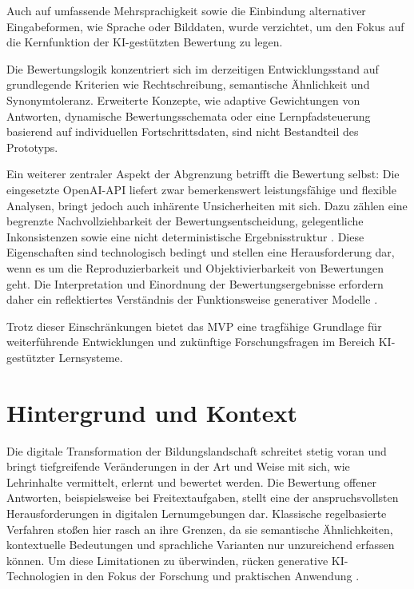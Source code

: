\documentclass[a4paper,12pt]{article}
\begin{document}
Auch auf umfassende Mehrsprachigkeit sowie die Einbindung alternativer Eingabeformen, wie Sprache oder Bilddaten, wurde verzichtet, um den Fokus auf die Kernfunktion der KI-gestützten Bewertung zu legen.

Die Bewertungslogik konzentriert sich im derzeitigen Entwicklungsstand auf grundlegende Kriterien wie Rechtschreibung, semantische Ähnlichkeit und Synonymtoleranz. Erweiterte Konzepte, wie adaptive Gewichtungen von Antworten, dynamische Bewertungsschemata oder eine Lernpfadsteuerung basierend auf individuellen Fortschrittsdaten, sind nicht Bestandteil des Prototyps.

Ein weiterer zentraler Aspekt der Abgrenzung betrifft die Bewertung selbst: Die eingesetzte OpenAI-API liefert zwar bemerkenswert leistungsfähige und flexible Analysen, bringt jedoch auch inhärente Unsicherheiten mit sich. Dazu zählen eine begrenzte Nachvollziehbarkeit der Bewertungsentscheidung, gelegentliche Inkonsistenzen sowie eine nicht deterministische Ergebnisstruktur \parencite{openai_reasoning}. Diese Eigenschaften sind technologisch bedingt und stellen eine Herausforderung dar, wenn es um die Reproduzierbarkeit und Objektivierbarkeit von Bewertungen geht. Die Interpretation und Einordnung der Bewertungsergebnisse erfordern daher ein reflektiertes Verständnis der Funktionsweise generativer Modelle \parencite{luckin}.

Trotz dieser Einschränkungen bietet das MVP eine tragfähige Grundlage für weiterführende Entwicklungen und zukünftige Forschungsfragen im Bereich KI-gestützter Lernsysteme.

\newpage

\section{Hintergrund und Kontext}
\label{sec:hintergrund}
Die digitale Transformation der Bildungslandschaft schreitet stetig voran und bringt tiefgreifende Veränderungen in der Art und Weise mit sich, wie Lehrinhalte vermittelt, erlernt und bewertet werden. Die Bewertung offener Antworten, beispielsweise bei Freitextaufgaben, stellt eine der anspruchsvollsten Herausforderungen in digitalen Lernumgebungen dar. Klassische regelbasierte Verfahren stoßen hier rasch an ihre Grenzen, da sie semantische Ähnlichkeiten, kontextuelle Bedeutungen und sprachliche Varianten nur unzureichend erfassen können. Um diese Limitationen zu überwinden, rücken generative KI-Technologien in den Fokus der Forschung und praktischen Anwendung \parencite{luckin}.
\end{document}
